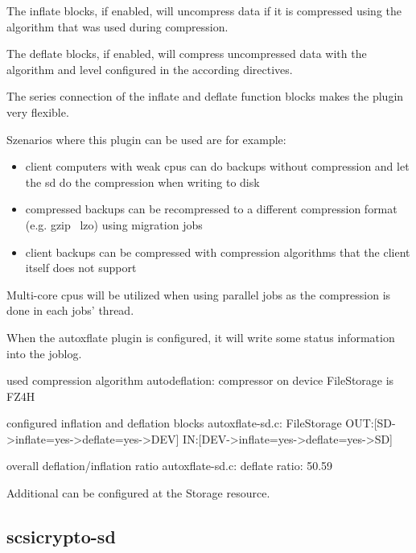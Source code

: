 The inflate blocks, if enabled, will uncompress data if it is compressed using the
algorithm that was used during compression.

The deflate blocks, if enabled, will compress uncompressed data with the algorithm and level configured in the according directives.

The series connection of the inflate and deflate function blocks makes the plugin very flexible.

Szenarios where this plugin can be used are for example:
\begin{itemize}
   \item client computers with weak cpus can do backups without compression and let the sd do the compression when writing to disk
    \item compressed backups can be recompressed to a different compression format (e.g. gzip \textrightarrow\ lzo) using migration jobs
    \item client backups can be compressed with compression algorithms that the client itself does not support
\end{itemize}

Multi-core cpus will be utilized when using parallel jobs as the compression is done in each jobs' thread.

When the autoxflate plugin is configured, it will write some status information into the joblog.

\begin{bmessage}{used compression algorithm}
autodeflation: compressor on device FileStorage is FZ4H
\end{bmessage}

\begin{bmessage}{configured inflation and deflation blocks}
autoxflate-sd.c: FileStorage OUT:[SD->inflate=yes->deflate=yes->DEV] IN:[DEV->inflate=yes->deflate=yes->SD]
\end{bmessage}

\begin{bmessage}{overall deflation/inflation ratio}
autoxflate-sd.c: deflate ratio: 50.59%
\end{bmessage}

Additional  can be configured at the Storage resource.


\subsection{scsicrypto-sd}

